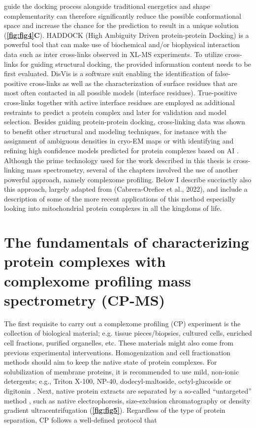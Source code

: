 guide the docking process alongside traditional energetics and shape complementarity can therefore significantly reduce the possible conformational space and increase the chance for the prediction to result in a unique solution \cite{Dominguez_2003, van_Zundert_2016} (\textbf{\autoref{fig:fig4}C}). HADDOCK \cite{Dominguez_2003, Orban-Nemeth_2018} (High Ambiguity Driven protein-protein Docking) is a powerful tool that can make use of biochemical and/or biophysical interaction data such as inter cross-links observed in XL-MS experiments. To utilize cross-links for guiding structural docking, the provided information content needs to be first evaluated. DisVis \cite{van_Zundert_2015} is a software suit enabling the identification of false-positive cross-links as well as the characterization of surface residues that are most often contacted in all possible models (interface residues). True-positive cross-links together with active interface residues are employed as additional restraints to predict a protein complex and later for validation and model selection. Besides guiding protein-protein docking, cross-linking data was shown to benefit other structural and modeling techniques, for instance with the assignment of ambiguous densities in cryo-EM maps \cite{Herzog_2012, Kyrilis_2021b} or with identifying and refining high confidence models predicted for protein complexes based on AI \cite{Burke_2021}.\\
Although the prime technology used for the work described in this thesis is cross-linking mass spectrometry, several of the chapters involved the use of another powerful approach, namely complexome profiling. Below I describe succinctly also this approach, largely adapted from (Cabrera-Orefice et al., 2022), and include a description of some of the more recent applications of this method especially looking into mitochondrial protein complexes in all the kingdoms of life.

\section{The fundamentals of characterizing protein complexes with complexome profiling mass spectrometry (CP-MS)} \label{sec:CP_MS_intro}
The first requisite to carry out a complexome profiling (CP) experiment is the collection of biological material; e.g. tissue pieces/biopsies, cultured cells, enriched cell fractions, purified organelles, etc. These materials might also come from previous experimental interventions. Homogenization and cell fractionation methods should aim to keep the native state of protein complexes. For solubilization of membrane proteins, it is recommended to use mild, non-ionic detergents; e.g., Triton X-100, NP-40, dodecyl-maltoside, octyl-glucoside or digitonin \cite{Eubel_2005, Wittig_2006}. Next, native protein extracts are separated by a so-called “untargeted” method \cite{Iacobucci_2021}, such as native electrophoresis, size-exclusion chromatography or density gradient ultracentrifugation (\textbf{\autoref{fig:fig5}}). Regardless of the type of protein separation, CP follows a well-defined protocol that\\

